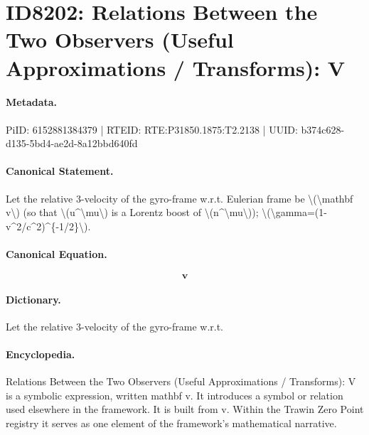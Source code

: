 \section*{ID8202: Relations Between the Two Observers (Useful Approximations / Transforms): V}
\paragraph{Metadata.}
PiID: 6152881384379 | RTEID: RTE:P31850.1875:T2.2138 | UUID: b374c628-d135-5bd4-ae2d-8a12bbd640fd

\paragraph{Canonical Statement.}
Let the relative 3-velocity of the gyro-frame w.r.t. Eulerian frame be \textbackslash{}(\textbackslash{}mathbf v\textbackslash{}) (so that \textbackslash{}(u\textasciicircum{}\textbackslash{}mu\textbackslash{}) is a Lorentz boost of \textbackslash{}(n\textasciicircum{}\textbackslash{}mu\textbackslash{})); \textbackslash{}(\textbackslash{}gamma=(1-v\textasciicircum{}2/c\textasciicircum{}2)\textasciicircum{}\{-1/2\}\textbackslash{}).

\paragraph{Canonical Equation.}
\[
\mathbf v
\]

\paragraph{Dictionary.}
Let the relative 3-velocity of the gyro-frame w.r.t.

\paragraph{Encyclopedia.}
Relations Between the Two Observers (Useful Approximations / Transforms): V is a symbolic expression, written mathbf v. It introduces a symbol or relation used elsewhere in the framework. It is built from v. Within the Trawin Zero Point registry it serves as one element of the framework's mathematical narrative.

